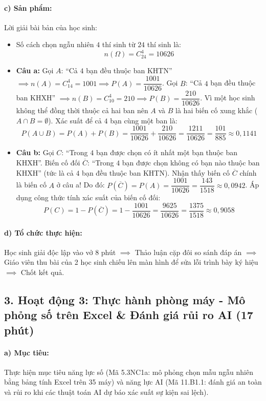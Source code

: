 \documentclass[12pt, a4paper]{article}
\begin{document}
\paragraph{c) Sản phẩm:} Lời giải bài bản của học sinh:
\begin{itemize}[leftmargin=0.8cm]
    \item Số cách chọn ngẫu nhiên $4$ thí sinh từ $24$ thí sinh là:
    $$n(\Omega) = C_{24}^4 = 10626$$
    \item \textbf{Câu a:}
    Gọi $A$: ``Cả $4$ bạn đều thuộc ban KHTN'' $\implies n(A) = C_{14}^4 = 1001 \implies P(A) = \dfrac{1001}{10626}$.
    Gọi $B$: ``Cả $4$ bạn đều thuộc ban KHXH'' $\implies n(B) = C_{10}^4 = 210 \implies P(B) = \dfrac{210}{10626}$.
    Vì một học sinh không thể đồng thời thuộc cả hai ban nên $A$ và $B$ là hai biến cố xung khắc ($A \cap B = \emptyset$).
    Xác suất để cả $4$ bạn cùng một ban là:
    $$P(A \cup B) = P(A) + P(B) = \dfrac{1001}{10626} + \dfrac{210}{10626} = \dfrac{1211}{10626} = \dfrac{101}{885} \approx 0{,}1141$$
    \item \textbf{Câu b:}
    Gọi $C$: ``Trong $4$ bạn được chọn có ít nhất một bạn thuộc ban KHXH''.
    Biến cố đối $\overline{C}$: ``Trong $4$ bạn được chọn không có bạn nào thuộc ban KHXH'' (tức là cả $4$ bạn đều thuộc ban KHTN).
    Nhận thấy biến cố $\overline{C}$ chính là biến cố $A$ ở câu a!
    Do đó: $P(\overline{C}) = P(A) = \dfrac{1001}{10626} = \dfrac{143}{1518} \approx 0{,}0942$.
    Áp dụng công thức tính xác suất của biến cố đối:
    $$P(C) = 1 - P(\overline{C}) = 1 - \dfrac{1001}{10626} = \dfrac{9625}{10626} = \dfrac{1375}{1518} \approx 0{,}9058$$
\end{itemize}

\paragraph{d) Tổ chức thực hiện:} Học sinh giải độc lập vào vở 8 phút $\implies$ Thảo luận cặp đôi so sánh đáp án $\implies$ Giáo viên thu bài của 2 học sinh chiếu lên màn hình để sửa lỗi trình bày ký hiệu $\implies$ Chốt kết quả.

\subsection*{3. Hoạt động 3: Thực hành phòng máy - Mô phỏng số trên Excel \& Đánh giá rủi ro AI (17 phút)}

\paragraph{a) Mục tiêu:} Thực hiện mục tiêu năng lực số (Mã 5.3NC1a: mô phỏng chọn mẫu ngẫu nhiên bằng bảng tính Excel trên 35 máy) và năng lực AI (Mã 11.B1.1: đánh giá an toàn và rủi ro khi các thuật toán AI dự báo xác suất sự kiện sai lệch).
\end{document}
